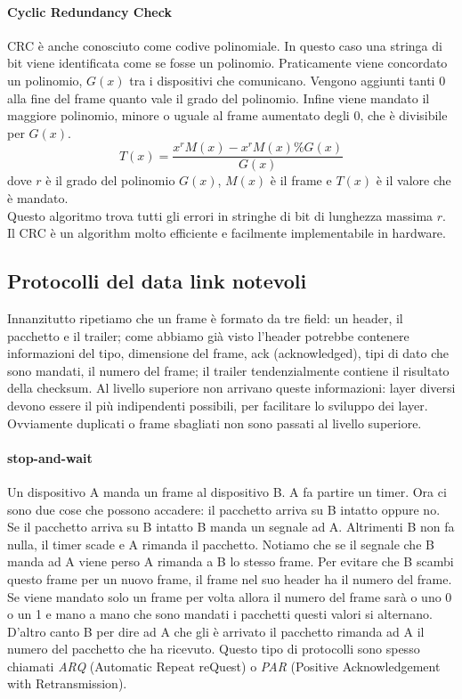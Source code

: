\documentclass{article}
\begin{document}
\paragraph{Cyclic Redundancy Check} CRC è anche conosciuto come codive
polinomiale. In questo caso una stringa di bit viene identificata come se fosse
un polinomio. Praticamente viene concordato un polinomio, $G(x)$ tra i dispositivi che
comunicano. Vengono aggiunti tanti 0 alla fine del frame quanto vale il grado
del polinomio. Infine viene mandato il maggiore polinomio, minore o uguale al
frame aumentato degli 0, che è divisibile per $G(x)$.
\begin{equation}
	T(x) = \frac{x^{r}M(x) - x^rM(x) \% G(x)}{G(x)}
\end{equation}
dove $r$ è il grado del polinomio $G(x)$, $M(x)$ è il frame e $T(x)$ è il valore
che è mandato.\\
Questo algoritmo trova tutti gli errori in stringhe di bit di lunghezza massima
$r$. Il CRC è un algorithm molto efficiente e facilmente implementabile in
hardware.

\subsection{Protocolli del data link notevoli}
Innanzitutto ripetiamo che un frame è formato da tre field: un header, il
pacchetto e il trailer; come abbiamo già visto l'header potrebbe contenere
informazioni del tipo, dimensione del frame, ack (acknowledged), tipi di dato
che sono mandati, il numero del frame; il trailer tendenzialmente contiene il
risultato della checksum. Al livello superiore non arrivano queste informazioni:
layer diversi devono essere il più indipendenti possibili, per facilitare lo
sviluppo dei layer.
Ovviamente duplicati o frame sbagliati non sono passati al livello superiore.

\paragraph{stop-and-wait} Un dispositivo A manda un frame al dispositivo B. A fa
partire un timer. Ora ci sono due cose che possono accadere: il pacchetto arriva
su B intatto oppure no. Se il pacchetto arriva su B intatto B manda un segnale
ad A. Altrimenti B non fa nulla, il timer scade e A rimanda il pacchetto.
Notiamo che se il segnale che B manda ad A viene perso A rimanda a B lo stesso
frame. Per evitare che B scambi questo frame per un nuovo frame, il frame nel
suo header ha il numero del frame. Se viene mandato solo un frame per volta
allora il numero del frame sarà o uno 0 o un 1 e mano a mano che sono mandati i
pacchetti questi valori si alternano. D'altro canto B per dire ad A che gli è
arrivato il pacchetto rimanda ad A il numero del pacchetto che ha ricevuto.
Questo tipo di protocolli sono spesso chiamati \textit{ARQ} (Automatic Repeat
reQuest) o \textit{PAR} (Positive Acknowledgement with Retransmission).
\end{document}
